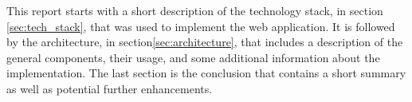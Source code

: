 This report starts with a short description of the technology stack, in section \ref{sec:tech_stack}, that was used to implement the web application. It is followed by the architecture, in section\ref{sec:architecture}, that includes a description of the general components, their usage, and some additional information about the implementation. The last section is the conclusion that contains a short summary as well as potential further enhancements.

\newpage